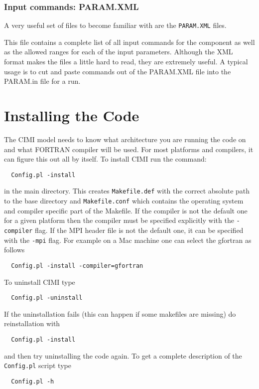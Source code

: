 \subsubsection{Input commands: PARAM.XML}
A very useful set of files to become familiar with are the {\tt PARAM.XML}
files.

This file contains a complete list of all input commands for the
component as well as the allowed ranges for each of the input parameters.
Although the XML format makes the files a little hard to read, they are
extremely useful.  A typical usage is to cut and paste commands out of the
PARAM.XML file into the PARAM.in file for a run.


\section{Installing the Code}


The CIMI model needs to know what architecture you are running the code on
and what FORTRAN compiler will be used.  For most platforms and compilers,
it can figure this out all by itself. To install CIMI run the command:
\begin{verbatim}
  Config.pl -install
\end{verbatim}
in the main directory. This creates {\tt Makefile.def} with
the correct absolute path to the base directory and {\tt Makefile.conf}
which contains the operating system and compiler specific part of
the Makefile. If the compiler is not the default one for a given
platform  then
the compiler must be specified explicitly with the {\tt -compiler}
flag. If the MPI header file is not the default one, it can be
specified with the {\tt -mpi} flag. For example on a Mac machine
one can select the gfortran as follows
\begin{verbatim}
  Config.pl -install -compiler=gfortran
\end{verbatim}
To uninstall CIMI type
\begin{verbatim}
  Config.pl -uninstall
\end{verbatim}
If the uninstallation fails (this can happen if some makefiles are missing)
do reinstallation with
\begin{verbatim}
  Config.pl -install
\end{verbatim}
and then try uninstalling the code again.
To get a complete description of the {\tt Config.pl}  script type
\begin{verbatim}
  Config.pl -h
\end{verbatim}

